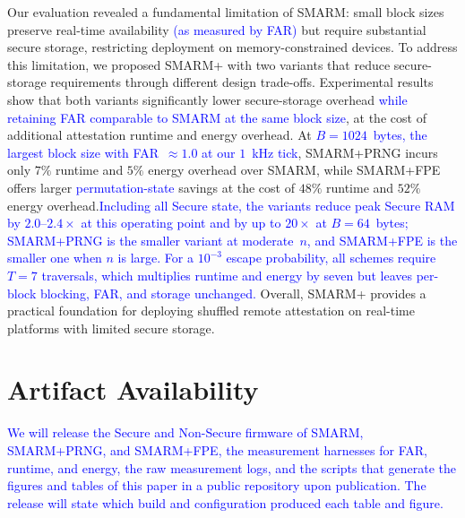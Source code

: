 \documentclass[journal]{IEEEtran}
\newcommand\ben[1]{\textcolor{blue}{#1}}
\newcommand{\rtsmarm}{SMARM+\xspace}
\newcommand{\rtsmarmone}{SMARM+PRNG\xspace}
\newcommand{\rtsmarmtwo}{SMARM+FPE\xspace}
\begin{document}
Our evaluation revealed a fundamental limitation of SMARM: small block sizes preserve real-time availability \ben{(as measured by FAR)} but require substantial secure storage, restricting deployment on memory-constrained devices. To address 
this limitation, we proposed \rtsmarm with two variants that reduce secure-storage requirements through different design trade-offs. Experimental results show that both variants significantly lower secure-storage overhead \ben{while retaining FAR comparable to SMARM at the same block size}, at 
the cost of additional attestation runtime and energy overhead. At \ben{$B = 1024$~bytes, the largest block size with FAR~$\approx 1.0$ at our $1$~kHz tick}, \rtsmarmone incurs only $7\%$ runtime and $5\%$ energy overhead over SMARM, while \rtsmarmtwo offers larger \ben{permutation-state} savings at the cost of $48\%$ runtime and $52\%$ energy overhead.\ben{Including all Secure state, the variants reduce peak Secure RAM by $2.0$--$2.4\times$ at this operating point and by up to $20\times$ at $B = 64$~bytes; \rtsmarmone is the smaller variant at moderate~$n$, and \rtsmarmtwo is the smaller one when $n$ is large.
For a $10^{-3}$ escape probability, all schemes require $T = 7$ traversals, which multiplies runtime and energy by seven but leaves per-block blocking, FAR, and storage unchanged.}
Overall, \rtsmarm provides a practical foundation for 
deploying shuffled remote attestation on real-time platforms with limited secure storage.

\section*{Artifact Availability}
\ben{We will release the Secure and Non-Secure firmware of SMARM, \rtsmarmone, and \rtsmarmtwo, the measurement harnesses for FAR, runtime, and energy, the raw measurement logs, and the scripts that generate the figures and tables of this paper in a public repository upon publication.
The release will state which build and configuration produced each table and figure.}






\end{document}
